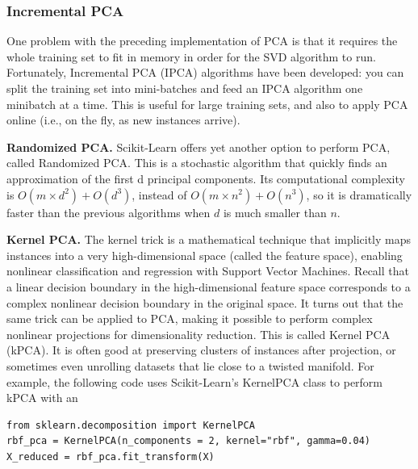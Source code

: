 \documentclass{beamer}
\begin{document}
\begin{frame}
\frametitle{Incremental PCA}

One problem with the preceding implementation of PCA is that it requires the whole training set to fit in
memory in order for the SVD algorithm to run. Fortunately, Incremental PCA (IPCA) algorithms have
been developed: you can split the training set into mini-batches and feed an IPCA algorithm one minibatch
at a time. This is useful for large training sets, and also to apply PCA online (i.e., on the fly, as new
instances arrive).

\noindent\textbf{Randomized PCA.}
Scikit-Learn offers yet another option to perform PCA, called Randomized PCA. This is a stochastic
algorithm that quickly finds an approximation of the first d principal components. Its computational
complexity is $O(m \times d^2)+O(d^3)$, instead of $O(m \times n^2) + O(n^3)$, so it is dramatically faster than the
previous algorithms when $d$ is much smaller than $n$.

\noindent\textbf{Kernel PCA.}
The kernel trick is a mathematical technique that implicitly maps instances into a
very high-dimensional space (called the feature space), enabling nonlinear classification and regression
with Support Vector Machines. Recall that a linear decision boundary in the high-dimensional feature
space corresponds to a complex nonlinear decision boundary in the original space.
It turns out that the same trick can be applied to PCA, making it possible to perform complex nonlinear
projections for dimensionality reduction. This is called Kernel PCA (kPCA). It is often good at
preserving clusters of instances after projection, or sometimes even unrolling datasets that lie close to a
twisted manifold.
For example, the following code uses Scikit-Learn’s KernelPCA class to perform kPCA with an




\begin{verbatim}
from sklearn.decomposition import KernelPCA
rbf_pca = KernelPCA(n_components = 2, kernel="rbf", gamma=0.04)
X_reduced = rbf_pca.fit_transform(X)

\end{verbatim}
\end{frame}
\end{document}
